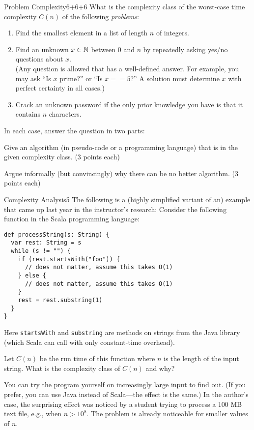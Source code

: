 \documentclass[a4paper]{article}
\begin{document}
\header

\begin{problem}{Problem Complexity}{6+6+6}
What is the complexity class of the worst-case time complexity $C(n)$ of the following \emph{problems}:
\begin{enumerate}
\item Find the smallest element in a list of length $n$ of integers.
\item Find an unknown $x\in \mathbb{N}$ between $0$ and $n$ by repeatedly asking yes/no questions about $x$.\\
(Any question is allowed that has a well-defined answer. For example, you may ask ``Is $x$ prime?'' or ``Is $x==5$?'' A solution must determine $x$ with perfect certainty in all cases.)
\item Crack an unknown password if the only prior knowledge you have is that it contains $n$ characters.
\end{enumerate}

In each case, answer the question in two parts:
\begin{compactitem}
\item Give an algorithm (in pseudo-code or a programming language) that is in the given complexity class. (3 points each)
\item Argue informally (but convincingly) why there can be no better algorithm. (3 points each)
\end{compactitem}
\end{problem}

\begin{problem}{Complexity Analysis}{5}
The following is a (highly simplified variant of an) example that came up last year in the instructor's research:
Consider the following function in the Scala programming language:

\begin{lstlisting}
def processString(s: String) {
  var rest: String = s
  while (s != "") {
    if (rest.startsWith("foo")) {
      // does not matter, assume this takes O(1)
    } else {
      // does not matter, assume this takes O(1)
    }
    rest = rest.substring(1)
  }
}
\end{lstlisting}
Here \lstinline|startsWith| and \lstinline|substring| are methods on strings from the Java library (which Scala can call with only constant-time overhead).

Let $C(n)$ be the run time of this function where $n$ is the length of the input string.
What is the complexity class of $C(n)$ and why?

You can try the program yourself on increasingly large input to find out. (If you prefer, you can use Java instead of Scala---the effect is the same.)
In the author's case, the surprising effect was noticed by a student trying to process a $100$ MB text file, e.g., when $n>10^8$. The problem is already noticeable for smaller values of $n$.
\end{problem}
\end{document}
